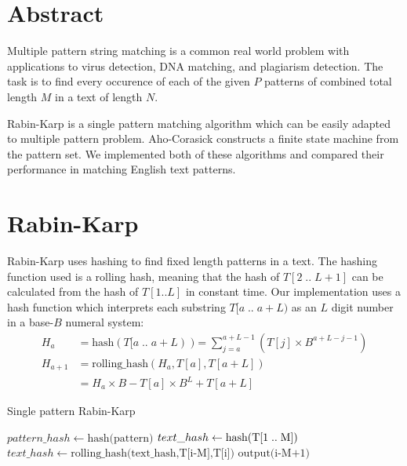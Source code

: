 \documentclass[final]{beamer}
\author{Aleksi Hartikainen and Jussi Kokkala}
\begin{document}
\begin{poster}

\newcolumn

\section{Abstract}
Multiple pattern string matching is a common real world problem with applications to virus detection, DNA matching, and plagiarism detection. The task is to find every occurence of each of the given $P$ patterns of combined total length $M$ in a text of length $N$.

Rabin-Karp is a single pattern matching algorithm which can be easily adapted to multiple pattern problem. Aho-Corasick constructs a finite state machine from the pattern set. We implemented both of these algorithms and compared their performance in matching English text patterns.

\section{Rabin-Karp}
      Rabin-Karp uses hashing to find fixed length patterns in a text. The hashing function used is a rolling hash, meaning that the hash of $T[2\;..\;L+1]$ can be calculated from the hash of $T[1..L]$ in constant time. Our implementation uses a hash function which interprets each substring $T[a\;..\;a+L)$ as an $L$ digit number in a base-$B$ numeral system:
\small
\begin{align*}
H_a &= \text{hash}(T[a\;..\;a+L)\;) = \sum_{j=a}^{a+L-1}(T[j] \times B^{a+L-j-1}) \\
H_{a+1} &= \text{rolling\_hash}(H_a, T[a], T[a+L])\\ 
&= H_a \times B -  T[a] \times B^{L}  + T[a+L]
\end{align*}
\normalsize
\vspace{10mm}
\begin{algorithm} [H]
\small
\caption{Single pattern Rabin-Karp}
\label{alg:rk_single}
\vspace{5mm}
\begin{algorithmic}[1]

\State $pattern\_hash \gets \text{hash(pattern)}$
\State $text\_hash \gets \text{hash(T[1\;..\;M])}$
        \State  $text\_hash \gets \text{rolling\_hash(text\_hash,T[i-M],T[i])}$
    \EndIf
            \State $\text{output(i-M+1)}$
        \EndIf
    \EndIf
\EndFor
\end{algorithmic}
\end{algorithm}


\end{poster}
\end{document}
